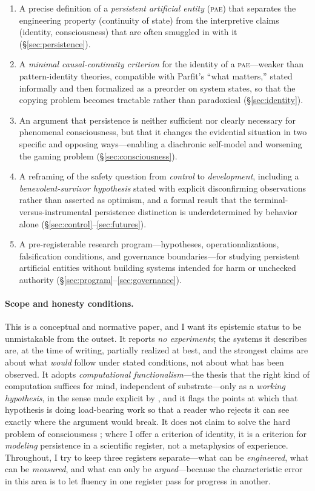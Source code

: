 \documentclass[11pt,a4paper]{article}
\theoremstyle{definition}
\newcommand{\pae}{\textsc{pae}\xspace}
\begin{document}
\begin{enumerate}[leftmargin=1.4em]
  \item A precise definition of a \emph{persistent artificial entity} (\pae) that separates the engineering property (continuity of state) from the interpretive claims (identity, consciousness) that are often smuggled in with it (\S\ref{sec:persistence}).
  \item A \emph{minimal causal-continuity criterion} for the identity of a \pae{}---weaker than pattern-identity theories, compatible with Parfit's ``what matters,'' stated informally and then formalized as a preorder on system states, so that the copying problem becomes tractable rather than paradoxical (\S\ref{sec:identity}).
  \item An argument that persistence is neither sufficient nor clearly necessary for phenomenal consciousness, but that it changes the evidential situation in two specific and opposing ways---enabling a diachronic self-model and worsening the gaming problem (\S\ref{sec:consciousness}).
  \item A reframing of the safety question from \emph{control} to \emph{development}, including a \emph{benevolent-survivor hypothesis} stated with explicit disconfirming observations rather than asserted as optimism, and a formal result that the terminal-versus-instrumental persistence distinction is underdetermined by behavior alone (\S\ref{sec:control}--\ref{sec:futures}).
  \item A pre-registerable research program---hypotheses, operationalizations, falsification conditions, and governance boundaries---for studying persistent artificial entities without building systems intended for harm or unchecked authority (\S\ref{sec:program}--\ref{sec:governance}).
\end{enumerate}

\paragraph{Scope and honesty conditions.} This is a conceptual and normative paper, and I want its epistemic status to be unmistakable from the outset. It reports \emph{no experiments}; the systems it describes are, at the time of writing, partially realized at best, and the strongest claims are about what \emph{would} follow under stated conditions, not about what has been observed. It adopts \emph{computational functionalism}---the thesis that the right kind of computation suffices for mind, independent of substrate---only as a \emph{working hypothesis}, in the sense made explicit by \citet{butlin2023}, and it flags the points at which that hypothesis is doing load-bearing work so that a reader who rejects it can see exactly where the argument would break. It does not claim to solve the hard problem of consciousness \citep{chalmers1995hard}; where I offer a criterion of identity, it is a criterion for \emph{modeling} persistence in a scientific register, not a metaphysics of experience. Throughout, I try to keep three registers separate---what can be \emph{engineered}, what can be \emph{measured}, and what can only be \emph{argued}---because the characteristic error in this area is to let fluency in one register pass for progress in another.
\end{document}
